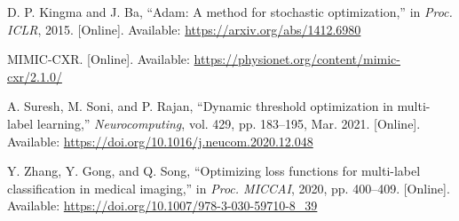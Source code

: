 \documentclass[12pt]{article}
\begin{document}
\begin{thebibliography}{99}
D. P. Kingma and J. Ba, “Adam: A method for stochastic optimization,” in \textit{Proc. ICLR}, 2015. [Online]. Available: \url{https://arxiv.org/abs/1412.6980}

MIMIC-CXR. [Online]. Available: \url{https://physionet.org/content/mimic-cxr/2.1.0/}

A. Suresh, M. Soni, and P. Rajan, “Dynamic threshold optimization in multi-label learning,” \textit{Neurocomputing}, vol. 429, pp. 183–195, Mar. 2021. [Online]. Available: \url{https://doi.org/10.1016/j.neucom.2020.12.048}

Y. Zhang, Y. Gong, and Q. Song, “Optimizing loss functions for multi-label classification in medical imaging,” in \textit{Proc. MICCAI}, 2020, pp. 400–409. [Online]. Available: \url{https://doi.org/10.1007/978-3-030-59710-8_39}

\end{thebibliography}
\end{document}
